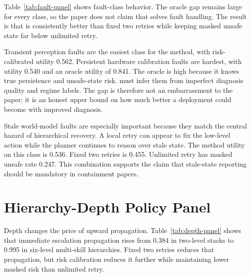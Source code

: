 Table~\ref{tab:fault-panel} shows fault-class behavior. The oracle gap remains large for every class, so the paper does not claim that \method solves fault handling. The result is that \method is consistently better than fixed two retries while keeping masked unsafe state far below unlimited retry.

\begin{table}[t]
\centering
\caption{Fault-class policy panel. \method improves over fixed two retries in every fault class, while the oracle gap remains substantial.}
\label{tab:fault-panel}
\resizebox{\linewidth}{!}{}
\end{table}

Transient perception faults are the easiest class for the method, with risk-calibrated utility 0.562. Persistent hardware calibration faults are hardest, with utility 0.540 and an oracle utility of 0.841. The oracle is high because it knows true persistence and unsafe-state risk. \method must infer them from imperfect diagnosis quality and regime labels. The gap is therefore not an embarrassment to the paper; it is an honest upper bound on how much better a deployment could become with improved diagnosis.

Stale world-model faults are especially important because they match the central hazard of hierarchical recovery. A local retry can appear to fix the low-level action while the planner continues to reason over stale state. The method utility on this class is 0.536. Fixed two retries is 0.455. Unlimited retry has masked unsafe rate 0.247. This combination supports the claim that stale-state reporting should be mandatory in containment papers.

\section{Hierarchy-Depth Policy Panel}

Depth changes the price of upward propagation. Table~\ref{tab:depth-panel} shows that immediate escalation propagation rises from 0.384 in two-level stacks to 0.995 in six-level multi-skill hierarchies. Fixed two retries reduces that propagation, but risk calibration reduces it further while maintaining lower masked risk than unlimited retry.

\begin{table}[t]
\centering
\caption{Hierarchy-depth policy panel. Risk calibration controls propagation as depth rises without adopting unlimited-retry masking.}
\label{tab:depth-panel}
\resizebox{\linewidth}{!}{}
\end{table}


